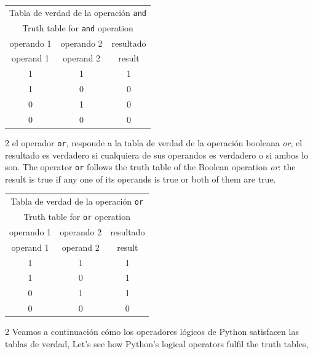 \begin{table}[h]
\centering
\begin{tabular}{c|c|c}
\multicolumn{3}{c}{Tabla de verdad de la operación \texttt{and}}\\
\multicolumn{3}{c}{Truth table for \texttt{and} operation}\\
\hline
\hline
operando 1&operando 2 &resultado\\
operand 1 & operand 2 & result\\
\hline
1&1&1\\
1&0&0\\
0&1&0\\
0&0&0\\ 
\hline
\hline
\end{tabular}
\end{table}

\begin{paracol}{2}
el operador \texttt{or}, responde a la tabla de verdad de la operación booleana \emph{or}, el resultado es verdadero si cualquiera de sus operandos es verdadero o si ambos lo son.
\switchcolumn
The operator \texttt{or} follows the truth table of the Boolean operation \emph{or}: the result is true if any one of its operands is true or both of them are true. 
\end{paracol}

\begin{table}[h]
\centering
\begin{tabular}{c|c|c}
\multicolumn{3}{c}{Tabla de verdad de la operación \texttt{or}}\\
\multicolumn{3}{c}{Truth table for \texttt{or} operation}\\
\hline
\hline
operando 1&operando 2 &resultado\\
operand 1 & operand 2 & result\\ 
\hline
1&1&1\\
1&0&1\\
0&1&1\\
0&0&0\\ 
\hline
\hline
\end{tabular}
\end{table} 
\begin{paracol}{2}
Veamos a continuación cómo los operadores lógicos de Python satisfacen las tablas de verdad,
\switchcolumn
Let's see how Python's logical operators fulfil the truth tables,
\end{paracol}

